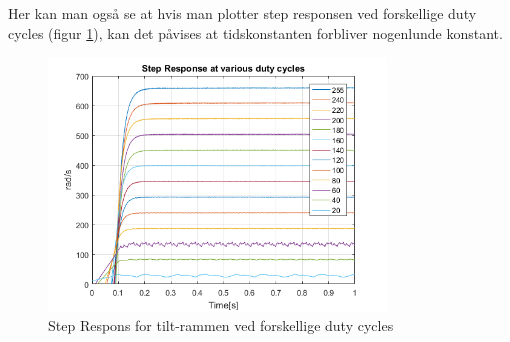 Her kan man også se at hvis man plotter step responsen ved forskellige duty cycles (figur \ref{fig:RPM_DC}), kan det påvises at tidskonstanten forbliver nogenlunde konstant. 

\begin{figure}[!ht]
	\begin{center}
		\includegraphics[width=0.8\textwidth]{Billeder/RPM_vs_DC.png}
	\end{center}
	\caption{Step Respons for tilt-rammen ved forskellige duty cycles}
	\label{fig:RPM_DC}
\end{figure}
